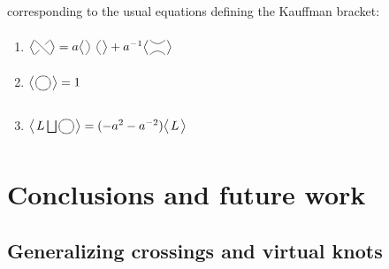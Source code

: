 \documentclass[]{llncs}
\begin{document}
  corresponding to the usual equations defining the Kauffman bracket:

\begin{enumerate}
\item $\bigl<
   \xygraph{              %
     !{0;/r1.0pc/:}
     [u(0.5)]
     !{\xunderv}
   }
 \bigr> 
 =
 a\bigl<\hspace{0.1pc} %
   \xygraph{
     !{0;/r1.0pc/:}
     [u(0.5)]
     !{\xunoverv}
   }\hspace{0.1pc}
 \bigr> 
 +
 a^{-1}\bigl<\hspace{0.1pc} %
 \xygraph{
  !{0;/r1.0pc/:}
       [u(0.5)]
  !{\xunoverh}
}\hspace{0.1pc}
\bigr>
 $

 \item $ \bigl<\hspace{0.1pc} 
 \xygraph{                          %
 !{0;/r1.0pc/:}
 !{\vcap-}
 !{\vcap+}
 }
 \hspace{0.1pc}
 \bigr>
 =1
 $
 
 \item $
 \bigl<\hspace{0.1pc}
 L \bigsqcup 
  \xygraph{               %
 !{0;/r1.0pc/:}
 !{\vcap-}
 !{\vcap+}
 }
 \hspace{0.1pc}\bigr>
 =
 (-a^{2}-a^{-2})\bigr<\hspace{0.1pc}L\hspace{0.1pc}\bigr>$
\end{enumerate}




\section{Conclusions and future work}

\subsection{Generalizing crossings and virtual knots}
\end{document}
